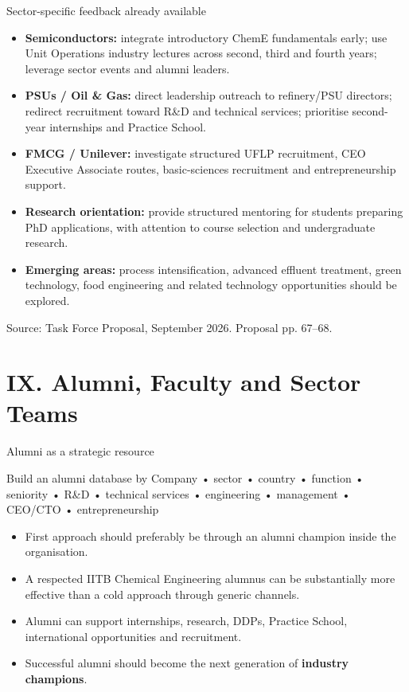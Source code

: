 \documentclass[aspectratio=169,11pt]{beamer}
\newcommand{\key}[1]{\textbf{\color{IITblue}#1}}
\newcommand{\sourcefoot}[1]{\vfill\tiny\color{gray}Source: Task Force Proposal, September 2026. #1}
\begin{document}
\begin{frame}{Sector-specific feedback already available}
\begin{itemize}
\item \key{Semiconductors:} integrate introductory ChemE fundamentals early; use Unit Operations industry lectures across second, third and fourth years; leverage sector events and alumni leaders.
\item \key{PSUs / Oil \& Gas:} direct leadership outreach to refinery/PSU directors; redirect recruitment toward R\&D and technical services; prioritise second-year internships and Practice School.
\item \key{FMCG / Unilever:} investigate structured UFLP recruitment, CEO Executive Associate routes, basic-sciences recruitment and entrepreneurship support.
\item \key{Research orientation:} provide structured mentoring for students preparing PhD applications, with attention to course selection and undergraduate research.
\item \key{Emerging areas:} process intensification, advanced effluent treatment, green technology, food engineering and related technology opportunities should be explored.
\end{itemize}
\sourcefoot{Proposal pp. 67--68.}
\end{frame}

\section{IX. Alumni, Faculty and Sector Teams}
\begin{frame}{Alumni as a strategic resource}
\begin{block}{Build an alumni database by}
Company • sector • country • function • seniority • R\&D • technical services • engineering • management • CEO/CTO • entrepreneurship
\end{block}
\vspace{4mm}
\begin{itemize}
\item First approach should preferably be through an alumni champion inside the organisation.
\item A respected IITB Chemical Engineering alumnus can be substantially more effective than a cold approach through generic channels.
\item Alumni can support internships, research, DDPs, Practice School, international opportunities and recruitment.
\item Successful alumni should become the next generation of \key{industry champions}.
\end{itemize}
\end{frame}
\end{document}
